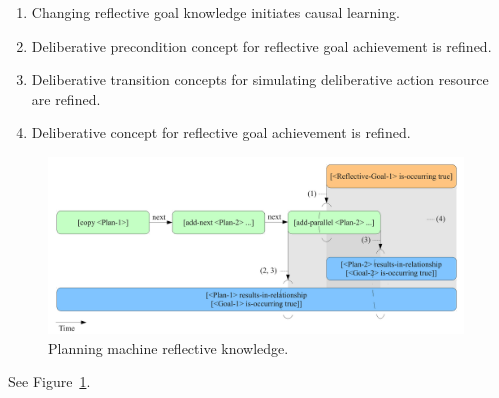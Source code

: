 \begin{enumerate}
\item{Changing reflective goal knowledge initiates causal learning.}
\item{Deliberative precondition concept for reflective goal achievement is refined.}
\item{Deliberative transition concepts for simulating deliberative action resource are refined.}
\item{Deliberative concept for reflective goal achievement is refined.}
\end{enumerate}

\begin{figure}[bth]
  \center
  \includegraphics[width=11cm]{gfx/planning_machine_reflective_knowledge}
  \caption[Planning machine reflective knowledge]{Planning machine reflective knowledge.}
  \label{fig:planning_machine_reflective_knowledge}
\end{figure}

See Figure~\ref{fig:planning_machine_reflective_knowledge}.



